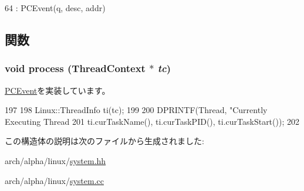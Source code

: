 \begin{DoxyCode}
64             : PCEvent(q, desc, addr) {}
\end{DoxyCode}


\subsection{関数}
\hypertarget{structLinuxAlphaSystem_1_1PrintThreadInfo_ad66a9d5ec7cfe597b848a17c0df5cc28}{
\subsubsection[{process}]{\setlength{\rightskip}{0pt plus 5cm}void process ({\bf ThreadContext} $\ast$ {\em tc})}}
\label{structLinuxAlphaSystem_1_1PrintThreadInfo_ad66a9d5ec7cfe597b848a17c0df5cc28}


\hyperlink{classPCEvent_af6ff225900b7b98c08880da7225b38f0}{PCEvent}を実装しています。


\begin{DoxyCode}
197 {
198     Linux::ThreadInfo ti(tc);
199 
200     DPRINTF(Thread, "Currently Executing Thread %
201             ti.curTaskName(), ti.curTaskPID(), ti.curTaskStart());
202 }
\end{DoxyCode}


この構造体の説明は次のファイルから生成されました:\begin{DoxyCompactItemize}
\item 
arch/alpha/linux/\hyperlink{arch_2alpha_2linux_2system_8hh}{system.hh}\item 
arch/alpha/linux/\hyperlink{arch_2alpha_2linux_2system_8cc}{system.cc}\end{DoxyCompactItemize}
